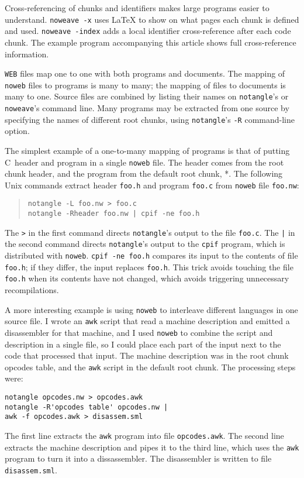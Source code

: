 Cross-referencing of chunks and identifiers makes large programs
easier to understand.
\verb+noweave -x+ uses {\LaTeX}
to show on what pages each chunk is defined and used.
\verb+noweave -index+ adds a local identifier cross-reference after
each code chunk.
The example program accompanying this article shows full cross-reference
information.


{\tt WEB} files map one to one with both programs and documents.
The mapping of \verb+noweb+ files to programs is many to many; the
mapping of files to documents is many to one.
Source files are combined by listing their names on \verb+notangle+'s
or \verb+noweave+'s command line.
Many programs may be extracted from one source by specifying the names
of different root chunks, using \verb+notangle+'s \verb+-R+ command-line
option.

The simplest example of a one-to-many mapping of programs is that of putting
C~header and program in a single {\tt noweb} file.
The header comes from the root chunk \LA{}header\RA{}, and the program
from the default root chunk, \LA{}*\RA{}.
The following Unix commands extract header \verb+foo.h+ and program
\verb+foo.c+ from {\tt noweb} file \verb+foo.nw+:
\begin{quote}
\begin{verbatim}
notangle -L foo.nw > foo.c
notangle -Rheader foo.nw | cpif -ne foo.h
\end{verbatim}
\end{quote}
The \verb+>+ in the first command directs \verb+notangle+'s output to
the file \verb+foo.c+.
The \verb+|+ in the second command directs \verb+notangle+'s output to
the \verb+cpif+ program, which is distributed with {\tt noweb}.
\verb+cpif -ne foo.h+ compares its input to the contents of file
\verb+foo.h+;  if they differ, the input replaces \verb+foo.h+.
This trick avoids touching the file \verb+foo.h+ when its contents
have not changed, which avoids triggering unnecessary recompilations.

A more interesting example is using {\tt noweb} to
interleave different languages in one source file.
I wrote an \verb+awk+
script that read a machine description and emitted a disassembler for
that machine, and I used {\tt noweb} to combine the script and description
in a single file, so I could place each part of the input next to the
code that processed that input.
The machine description was in the root chunk \LA{}opcodes
table\RA{}, and the \verb+awk+ script in the default root chunk.
The processing steps were:
\begin{verbatim}
notangle opcodes.nw > opcodes.awk
notangle -R'opcodes table' opcodes.nw |
awk -f opcodes.awk > disassem.sml
\end{verbatim}
The first line extracts the {\tt awk} program into file {\tt opcodes.awk}.
The second line extracts the machine description and pipes it to the
third line, which uses the {\tt awk} program to turn it into a
dissassembler.
The disassembler is written to file {\tt disassem.sml}.

